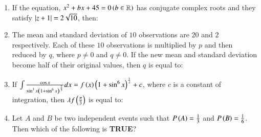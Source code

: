 \documentclass[journal,12pt,onecolumn]{IEEEtran}
\theoremstyle{remark}
\begin{document}
\begin{enumerate}
\item If the equation, $x^2+bx+45=0 \left(b\in\mathbb{R}\right)$ has conjugate complex roots and they satisfy $\left\vert z+1\right\vert=2\sqrt{10}$, then:

\hfill{}
\begin{enumerate}
\end{enumerate}

\item The mean and standard deviation of $10$ observations are $20$ and $2$ respectively. Each of these $10$ observations is multiplied by $p$ and then reduced by $q$, where $p\neq 0$ and $q\neq 0$. If the new mean and standard deviation become half of their original values, then $q$ is equal to:

\hfill{}
\begin{enumerate}
\end{enumerate}

\item If $\int \frac{\cos x}{\sin^{3}x\left(1+\sin^{6}x\right)^{\frac{2}{3}}}dx = f\left(x\right)\left(1+\sin^{6}x\right)^{\frac{1}{\lambda}}+c$, where $c$ is a constant of integration, then $\lambda f\left(\frac{\pi}{3}\right)$ is equal to:

\hfill{}
\begin{enumerate}
\end{enumerate}

\item Let $A$ and $B$ be two independent events such that $P\left(A\right)=\frac{1}{3}$ and $P\left(B\right)=\frac{1}{6}$. Then which of the following is \textbf{TRUE}?


\end{enumerate}
\end{document}
